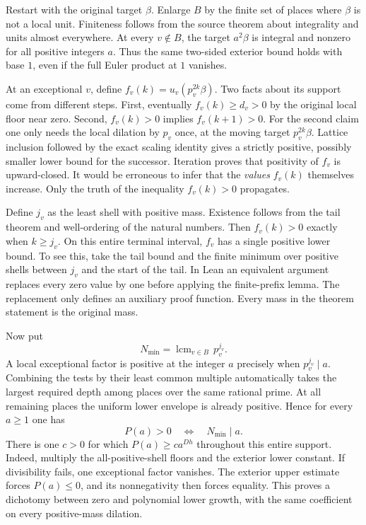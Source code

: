 \documentclass[12pt,letterpaper]{article}
\begin{document}
Restart with the original target $\beta$. Enlarge $B$ by the finite set of places where $\beta$ is not a local unit. Finiteness follows from the source theorem about integrality and units almost everywhere. At every $v\notin B$, the target $a^2\beta$ is integral and nonzero for all positive integers $a$. Thus the same two-sided exterior bound holds with base $1$, even if the full Euler product at $1$ vanishes.

At an exceptional $v$, define $f_v(k)=u_v(p_v^{2k}\beta)$. Two facts about its support come from different steps. First, eventually $f_v(k)\geq d_v>0$ by the original local floor near zero. Second, $f_v(k)>0$ implies $f_v(k+1)>0$. For the second claim one only needs the local dilation by $p_v$ once, at the moving target $p_v^{2k}\beta$. Lattice inclusion followed by the exact scaling identity gives a strictly positive, possibly smaller lower bound for the successor. Iteration proves that positivity of $f_v$ is upward-closed. It would be erroneous to infer that the \emph{values} $f_v(k)$ themselves increase. Only the truth of the inequality $f_v(k)>0$ propagates.

Define $j_v$ as the least shell with positive mass. Existence follows from the tail theorem and well-ordering of the natural numbers. Then $f_v(k)>0$ exactly when $k\geq j_v$. On this entire terminal interval, $f_v$ has a single positive lower bound. To see this, take the tail bound and the finite minimum over positive shells between $j_v$ and the start of the tail. In Lean an equivalent argument replaces every zero value by one before applying the finite-prefix lemma. The replacement only defines an auxiliary proof function. Every mass in the theorem statement is the original mass.

Now put
\[
     N_{\min}=\operatorname{lcm}_{v\in B}\,p_v^{j_v}.
\]
A local exceptional factor is positive at the integer $a$ precisely when $p_v^{j_v}\mid a$. Combining the tests by their least common multiple automatically takes the largest required depth among places over the same rational prime. At all remaining places the uniform lower envelope is already positive. Hence for every $a\geq1$ one has
\[
 P(a)>0 \quad\Longleftrightarrow\quad N_{\min}\mid a.
\]
There is one $c>0$ for which $P(a)\geq c a^{Dh}$ throughout this entire support. Indeed, multiply the all-positive-shell floors and the exterior lower constant. If divisibility fails, one exceptional factor vanishes. The exterior upper estimate forces $P(a)\leq0$, and its nonnegativity then forces equality. This proves a dichotomy between zero and polynomial lower growth, with the same coefficient on every positive-mass dilation.
\end{document}
